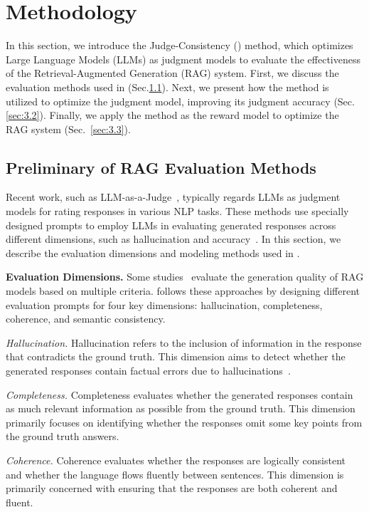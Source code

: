 \section{Methodology}
In this section, we introduce the Judge-Consistency (\method{}) method, which optimizes Large Language Models (LLMs) as judgment models to evaluate the effectiveness of the Retrieval-Augmented Generation (RAG) system. First, we discuss the evaluation methods used in \method{} (Sec.\ref{sec:3.1}). Next, we present how the \method{} method is utilized to optimize the judgment model, improving its judgment accuracy (Sec.\ref{sec:3.2}). Finally, we apply the \method{} method as the reward model to optimize the RAG system (Sec.~\ref{sec:3.3}). 

\subsection{Preliminary of RAG Evaluation Methods} \label{sec:3.1}
Recent work, such as LLM-as-a-Judge~\cite{zheng2023judging}, typically regards LLMs as judgment models for rating responses in various NLP tasks. These methods use specially designed prompts to employ LLMs in evaluating generated responses across different dimensions, such as hallucination and accuracy~\cite{li2024llms}. In this section, we describe the evaluation dimensions and modeling methods used in \method{}.

\textbf{Evaluation Dimensions.} Some studies~\cite{Rageval2024Zhu,zhang2025rag} evaluate the generation quality of RAG models based on multiple criteria. \method{} follows these approaches by designing different evaluation prompts for four key dimensions: hallucination, completeness, coherence, and semantic consistency.

\textit{Hallucination.} Hallucination refers to the inclusion of information in the response that contradicts the ground truth. This dimension aims to detect whether the generated responses contain factual errors due to hallucinations~\cite{xu2024hallucination}.

\textit{Completeness.} Completeness evaluates whether the generated responses contain as much relevant information as possible from the ground truth. This dimension primarily focuses on identifying whether the responses omit some key points from the ground truth answers.

\textit{Coherence.} Coherence evaluates whether the responses are logically consistent and whether the language flows fluently between sentences. This dimension is primarily concerned with ensuring that the responses are both coherent and fluent.

